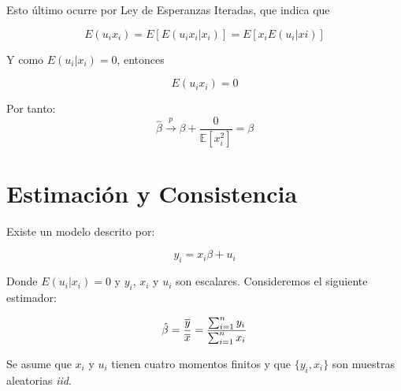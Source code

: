 \documentclass{exam}
\begin{document}
    Esto último ocurre por Ley de Esperanzas Iteradas, que indica que 
    
    $$E(u_ix_i) = E[E(u_ix_i|x_i)] = E[x_i E(u_i|xi)]$$
    
    Y como $E(u_i|x_i)=0$, entonces 
    
    $$E(u_ix_i) = 0$$
    
    Por tanto:
    \[\hat{\beta} \xrightarrow{p} \beta + \frac{0}{\mathbb{E}[x_i^2]} = \beta\]

\newpage
\section{Estimación y Consistencia}
Existe un modelo descrito por:

$$y_i = x_i \beta + u_i$$

Donde $E(u_i|x_i) = 0$ y $y_i$, $x_i$ y $u_i$ son escalares. Consideremos el siguiente estimador:

$$\Hat{\beta} = \frac{\overline{y}}{\overline{x}} = \frac{\sum_{i=1}^n y_i}{\sum_{i=1}^n x_i}$$

Se asume que $x_i$ y $u_i$ tienen cuatro momentos finitos y que $\{y_i,x_i\}$ son muestras aleatorias \textit{iid}.
\end{document}
